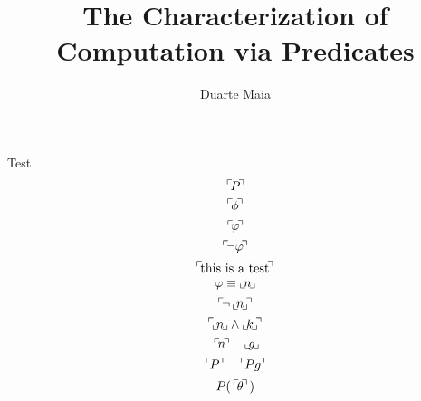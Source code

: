 \documentclass{article}
\title{The Characterization of Computation via Predicates}
\author{Duarte Maia}
\theoremstyle{nonumberplain}
\newcommand{\gn}[1]{\setbox0=\hbox{$\mathclap{\phantom{t}}#1$} \dimen0=\ht0 \advance\dimen0 by -1.25ex \,\raise\dimen0\hbox{$\ulcorner$} \! \box0 \! \raise\dimen0\hbox{$\urcorner$}\,}
\newcommand{\gf}[1]{\raise-0.25ex\hbox{$\llcorner$}\! #1 \!\raise-0.25ex\hbox{$\lrcorner$}}
\begin{document}
Test
\begin{equation}
\gn{P}
\end{equation}
\begin{equation}
\gn{\phi}
\end{equation}
\begin{equation}
\gn{\varphi}
\end{equation}
\begin{equation}
\gn{\neg\varphi}
\end{equation}\begin{equation}
\gn{\text{this is a test}}
\end{equation}
\begin{equation}
\varphi \equiv \gf{n}
\end{equation}
\begin{equation}
\gn{\neg\, \gf{n}}
\end{equation}
\begin{equation}
\gn{ \gf{n} \land \gf{k}}
\end{equation}
\begin{equation}
\gn{n} \quad \gf{g}
\end{equation}
\begin{equation}
\gn{P} \quad \gn{Pg}
\end{equation}
\begin{equation}
P(\gn\theta)
\end{equation}
\end{document}
